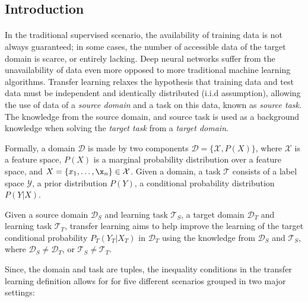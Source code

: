 \subsection{Introduction}
\paragraph{}
In the traditional supervised scenario, the availability of training data is not always guaranteed; in some cases, the number of accessible data of the target domain is scarce, or entirely lacking. Deep neural networks suffer from the unavailability of data even more opposed to more traditional machine learning algorithms. Transfer learning relaxes the hypothesis that training data and test data must be independent and identically distributed (i.i.d assumption), allowing the use of data of a \textit{source domain} and a task on this data, known as \textit{source task}. The knowledge from the source domain, and source task is used as a background knowledge when solving the \textit{target task} from a \textit{target domain}. 

Formally, a domain $\mathcal{D}$ is made by two components $\mathcal{D} = \{\mathcal{X}, P(X)\}$, where $\mathcal{X}$ is a feature space, $P(X)$ is a marginal probability distribution over a feature space, and $X = \{x_1, \dots, \x_n\} \in \mathcal{X}$. Given a domain, a task $\mathcal{T}$ 
consists of a label space $\mathcal{Y}$, a prior distribution $P(Y)$, a conditional probability distribution $P(Y|X)$. 

Given a source domain $\mathcal{D}_S$ and learning task $\mathcal{T}_S$, a target domain $\mathcal{D}_T$ and learning task $\mathcal{T}_T$, transfer learning aims to help improve the learning of the target conditional probability $P_T(Y_T|X_T)$ in $\mathcal{D}_T$ using the knowledge from $\mathcal{D}_S$ and $\mathcal{T}_S$, where $\mathcal{D}_S \neq \mathcal{D}_T$, or $\mathcal{T}_S \neq \mathcal{T}_T$.

Since, the domain and task are tuples, the inequality conditions in the transfer learning definition allows for for five different scenarios grouped in two major settings:

